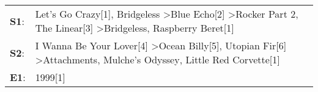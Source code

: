 \begin{supertabular}{p{0.03\textwidth}p{0.92\textwidth}}
 \textbf{S1}:  &  Let's Go Crazy[1]\textsuperscript{}, \enspace Bridgeless\textsuperscript{} \textgreater \enspace Blue Echo[2]\textsuperscript{} \textgreater \enspace Rocker Part 2\textsuperscript{}, \enspace The Linear[3]\textsuperscript{} \textgreater \enspace Bridgeless\textsuperscript{}, \enspace Raspberry Beret[1]\textsuperscript{}  \enspace  \\
 \textbf{S2}:  &                                   I Wanna Be Your Lover[4]\textsuperscript{} \textgreater \enspace Ocean Billy[5]\textsuperscript{}, \enspace Utopian Fir[6]\textsuperscript{} \textgreater \enspace Attachments\textsuperscript{}, \enspace Mulche's Odyssey\textsuperscript{}, \enspace Little Red Corvette[1]\textsuperscript{}  \enspace  \\
 \textbf{E1}:  &                                                                                                                                                                                                                                                                                                          1999[1]\textsuperscript{}  \enspace  \\
\end{supertabular}
